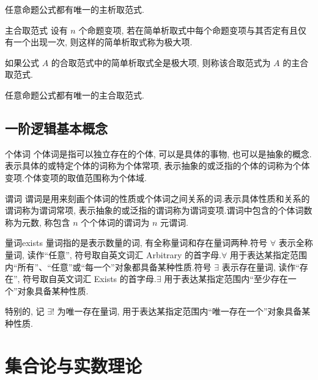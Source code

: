 \documentclass[cn,toc=twocol]{elegantbook}
\begin{document}
\begin{theorem}
任意命题公式都有唯一的主析取范式.
\end{theorem}

\begin{definition}{主合取范式}
设有 $n$ 个命题变项, 若在简单析取式中每个命题变项与其否定有且仅有一个出现一次, 则这样的简单析取式称为极大项.

如果公式 $A$ 的合取范式中的简单析取式全是极大项, 则称该合取范式为 $A$ 的主合取范式.
\end{definition}

\begin{theorem}
任意命题公式都有唯一的主合取范式.
\end{theorem}

\section{一阶逻辑基本概念}

\begin{definition}{个体词}
个体词是指可以独立存在的个体, 可以是具体的事物, 也可以是抽象的概念.表示具体的或特定个体的词称为个体常项, 表示抽象的或泛指的个体的词称为个体变项.个体变项的取值范围称为个体域.
\end{definition}


\begin{definition}{谓词}
谓词是用来刻画个体词的性质或个体词之间关系的词.表示具体性质和关系的谓词称为谓词常项, 表示抽象的或泛指的谓词称为谓词变项.谓词中包含的个体词数称为元数, 称包含 $n$ 个个体词的谓词为 $n$ 元谓词.
\end{definition}


\begin{definition}{量词}{exists}
量词指的是表示数量的词, 有全称量词和存在量词两种.符号 $\forall$ 表示全称量词, 读作“任意”, 符号取自英文词汇 Arbitrary 的首字母.$\forall$ 用于表达某指定范围内“所有”、“任意”或“每一个”对象都具备某种性质.符号 $\exists$ 表示存在量词, 读作“存在”, 符号取自英文词汇 Exists 的首字母.$\exists$ 用于表达某指定范围内“至少存在一个”对象具备某种性质.

特别的, 记 $\exists !$ 为唯一存在量词, 用于表达某指定范围内“唯一存在一个”对象具备某种性质.
\end{definition}

\chapter{集合论与实数理论}
\end{document}
